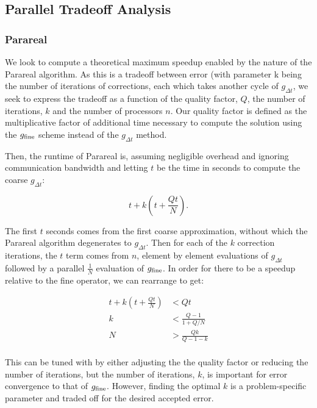 \documentclass[letterpaper,12pt]{article}
\begin{document}
\subsection{Parallel Tradeoff Analysis}

\subsubsection{Parareal}

We look to compute a theoretical maximum speedup enabled by the nature of the Parareal algorithm. As this is a tradeoff between error (with parameter k being the number of iterations of corrections, each which takes another cycle of $g_{\Delta t}$, we seek to express the tradeoff as a function of the quality factor, $Q$, the number of iterations, $k$ and the number of processors $n$. Our quality factor is defined as the multiplicative factor of additional time necessary to compute the solution using the $g_{\textnormal{fine}}$ scheme instead of the $g_{\Delta t}$ method.

Then, the runtime of Parareal is, assuming negligible overhead and ignoring communication bandwidth and letting $t$ be the time in seconds to compute the coarse $g_{\Delta t}$:

\begin{equation}
t + k \left(t + \frac{Qt}{N} \right).
\label{eq:scheme}
\end{equation}

The first $t$ seconds comes from the first coarse approximation, without which the Parareal algorithm degenerates to $g_{\Delta t}$. Then for each of the $k$ correction iterations, the $t$ term comes from $n$, element by element evaluations of $g_{\Delta t}$ followed by a parallel $\frac{1}{N}$ evaluation of $g_{\textnormal{fine}}$. In order for there to be a speedup relative to the fine operator, we can rearrange to get:

\[
\begin{aligned}
t + k\left( t + \frac{Qt}{N} \right) &< Qt \\
k &< \frac{Q - 1}{1 + Q/N} \\
N &> \frac{Qk}{Q - 1 - k} \\
\end{aligned}
\]

This can be tuned with by either adjusting the the quality factor or reducing the number of iterations, but the number of iterations, $k$, is important for error convergence to that of $g_{\textnormal{fine}}$. However, finding the optimal $k$ is a problem-specific parameter and traded off for the desired accepted error.
\end{document}
